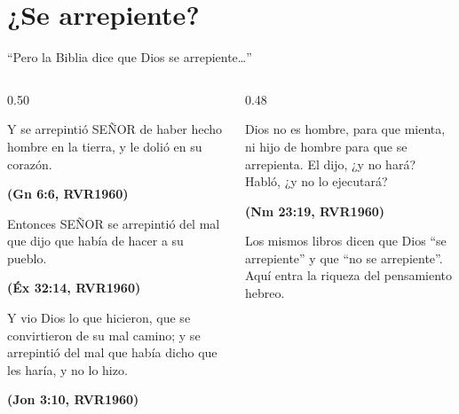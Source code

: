 \documentclass[hyperref={bookmarks=false},aspectratio=169]{beamer}
\newcommand{\SENOR}{S{\fontsize{0.78em}{1em}\selectfont EÑOR}}
\newcommand{\fuente}[1]{\par\hfill{\upshape\bfseries\footnotesize\textcolor{azul}{#1}}}
\begin{document}
\section{¿Se arrepiente?}

\begin{frame}{``Pero la Biblia dice que Dios se arrepiente\ldots''}
\begin{columns}[t,onlytextwidth]
\begin{column}{0.50\textwidth}
\begin{cita}Y se arrepintió \SENOR{} de haber hecho hombre en la tierra, y le dolió en su corazón.\fuente{(Gn 6:6, RVR1960)}\end{cita}
\begin{cita}Entonces \SENOR{} se arrepintió del mal que dijo que había de hacer a su pueblo.\fuente{(Éx 32:14, RVR1960)}\end{cita}
\begin{cita}Y vio Dios lo que hicieron, que se convirtieron de su mal camino; y se arrepintió del mal que había dicho que les haría, y no lo hizo.\fuente{(Jon 3:10, RVR1960)}\end{cita}
\end{column}
\begin{column}{0.48\textwidth}
\begin{cita}Dios no es hombre, para que mienta, ni hijo de hombre para que se arrepienta. El dijo, ¿y no hará? Habló, ¿y no lo ejecutará?\fuente{(Nm 23:19, RVR1960)}\end{cita}
\small Los mismos libros dicen que Dios ``se arrepiente'' y que ``no se arrepiente''. Aquí entra la riqueza del pensamiento hebreo.
\end{column}
\end{columns}
\end{frame}
\end{document}
